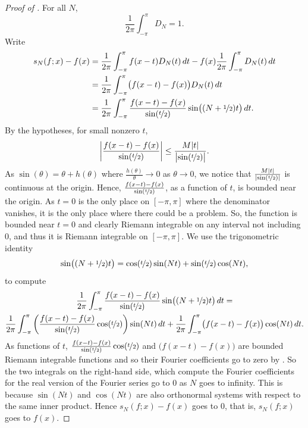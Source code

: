 \begin{proof}[Proof of ]
For all $N$,
\begin{equation*}
\frac{1}{2\pi} \int_{-\pi}^\pi D_N = 1 .
\end{equation*}
Write
\begin{equation*}
\begin{split}
s_N(f;x)-f(x) & =
\frac{1}{2\pi} \int_{-\pi}^\pi f(x-t) D_N(t) \, dt 
-
f(x)
\frac{1}{2\pi} \int_{-\pi}^\pi D_N(t) \, dt
\\
& = 
\frac{1}{2\pi} \int_{-\pi}^\pi \bigl( f(x-t) - f(x) \bigr) D_N(t) \, dt 
\\
& = 
\frac{1}{2\pi} \int_{-\pi}^\pi \frac{f(x-t) - f(x)}{\sin(\nicefrac{t}{2})} \sin\bigl(
(N+\nicefrac{1}{2})t \bigr) \, dt .
\end{split}
\end{equation*}
By the hypotheses,
for small nonzero $t$,
\begin{equation*}
\left\lvert { \frac{f(x-t) - f(x)}{\sin(\nicefrac{t}{2})} } \right\rvert
\leq
\frac{M\lvert {t} \rvert}{\bigl\lvert {\sin(\nicefrac{t}{2})} \bigr\rvert} .
\end{equation*}
As $\sin(\theta) = \theta + h(\theta)$ where $\frac{h(\theta)}{\theta} \to
0$ as $\theta \to 0$,
we notice that
$\frac{M\lvert {t} \rvert}{\lvert {\sin(\nicefrac{t}{2})} \rvert}$ is continuous at the
origin.
Hence,
$\frac{f(x-t) - f(x)}{\sin(\nicefrac{t}{2})}$, as a function of $t$,
is bounded near the origin.
As $t=0$ is the only place on $[-\pi,\pi]$ where the denominator vanishes,
it is the only place where there could be a problem.
So, the function is bounded near $t=0$ and clearly
Riemann integrable on any interval not including $0$, and thus
it is Riemann integrable on $[-\pi,\pi]$.
We use the trigonometric identity
\begin{equation*}
\sin\bigl( (N+\nicefrac{1}{2})t \bigr)
=
\cos(\nicefrac{t}{2}) \sin(Nt) + 
\sin(\nicefrac{t}{2}) \cos(Nt) ,
\end{equation*}
to compute
\begin{multline*}
\frac{1}{2\pi} \int_{-\pi}^\pi \frac{f(x-t) - f(x)}{\sin(\nicefrac{t}{2})} \sin\bigl(
(N+\nicefrac{1}{2})t \bigr) \, dt 
= \\
\frac{1}{2\pi} \int_{-\pi}^\pi
\left( \frac{f(x-t) - f(x)}{\sin(\nicefrac{t}{2})}
\cos (\nicefrac{t}{2}) \right) \sin (Nt) \, dt
+
\frac{1}{2\pi} \int_{-\pi}^\pi \bigl( f(x-t) - f(x) \bigr)
\cos (Nt) \, dt .
\end{multline*}
As functions of $t$, 
$\frac{f(x-t) - f(x)}{\sin(\nicefrac{t}{2})} \cos (\nicefrac{t}{2})$
and
$\bigl( f(x-t) - f(x) \bigr)$ are bounded Riemann integrable functions
and so their Fourier coefficients go to zero by .  So the two
integrals on the right-hand side, which compute the Fourier coefficients
for the real version of the Fourier series go to 0 as $N$ goes to infinity.
This is because $\sin(Nt)$ and $\cos(Nt)$ are also orthonormal systems
with respect to the same inner product.
Hence $s_N(f;x)-f(x)$ goes to 0, that is, $s_N(f;x)$ goes to $f(x)$.
\end{proof}

